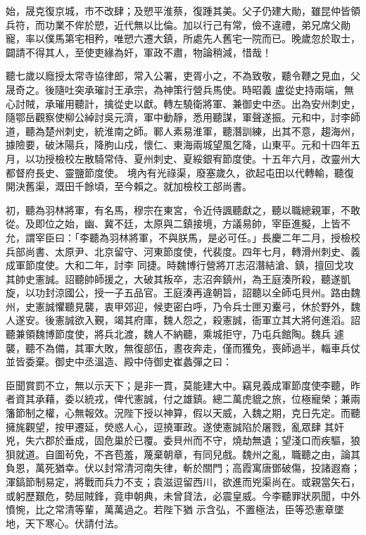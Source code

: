 \begin{pinyinscope}
 始，晟克復京城，市不改肆；及愬平淮蔡，復踵其美。父子仍建大勛，雖昆仲皆領兵符，而功業不侔於愬，近代無以比倫。加以行己有常，儉不違禮，弟兄席父勛寵，率以僕馬第宅相矜，唯愬六遷大鎮，所處先人舊宅一院而已。晚歲忽於取士，闢請不得其人，至使吏緣為奸，軍政不肅，物論稍減，惜哉！



 聽七歲以廕授太常寺協律郎，常入公署，吏胥小之，不為致敬，聽令鞭之見血，父晟奇之。後隨吐突承璀討王承宗，為神策行營兵馬使。時昭義
 盧從史持兩端，無心討賊，承璀用聽計，擒從史以獻。轉左驍衛將軍、兼御史中丞。出為安州刺史，隨鄂岳觀察使柳公綽討吳元濟，軍中動靜，悉用聽謀，軍聲遂振。元和中，討李師道，聽為楚州刺史，統淮南之師。鄆人素易淮軍，聽潛訓練，出其不意，趨海州，據險要，破沐陽兵，降朐山戍，懷仁、東海兩城望風乞降，山東平。元和十四年五月，以功授檢校左散騎常侍、夏州刺史、夏綏銀宥節度使。十五年六月，改靈州大都督府長史、靈鹽節度使。
 境內有光祿渠，廢塞歲久，欲起屯田以代轉輸，聽復開決舊渠，溉田千餘頃，至今賴之。就加檢校工部尚書。



 初，聽為羽林將軍，有名馬，穆宗在東宮，令近侍諷聽獻之，聽以職總親軍，不敢從。及即位之始，幽、冀不廷，太原與二鎮接境，方議易帥，宰臣進擬，上皆不允，謂宰臣曰：「李聽為羽林將軍，不與朕馬，是必可任。」長慶二年二月，授檢校兵部尚書、太原尹、北京留守、河東節度使，代裴度。四年七月，轉滑州刺史、義成軍節度使。大和二年，討李
 同捷。時魏博行營將丌志沼潛結滄、鎮，擅回戈攻其帥史憲誠。詔聽帥師援之，大破其叛卒，志沼奔鎮州，為王庭湊所殺，聽遂凱旋，以功封涼國公，授一子五品官。王庭湊再違朝旨，詔聽以全師屯貝州。路由魏州，史憲誠懼聽見襲，衷甲郊迎，候吏密白呼，乃令兵士匣刃櫜弓，休於野外，魏人遂安。後憲誠欲入覲，竭其府庫，魏人怨之，殺憲誠，衙軍立其大將何進滔。詔聽兼領魏博節度使，將兵北渡，魏人不納聽，乘城拒守，乃屯兵館陶。魏兵
 遽襲，聽不為備，其軍大敗，無復部伍，晝夜奔走，僅而獲免，喪師過半，輜車兵仗並皆委棄。御史中丞溫造、殿中侍御史崔蠡彈之曰：



 臣聞賞罰不立，無以示天下；是非一貫，莫能建大中。竊見義成軍節度使李聽，昨者資其承藉，委以統戎，俾代憲誠，付之雄鎮。總二萬虎貔之旅，位極寵榮；兼兩籓節制之權，心無報效。況陛下授以神算，假以天威，入魏之期，克日先定。而聽擁旄觀望，按甲遷延，熒惑人心，逗撓軍政。遂使憲誠陷於屠戮，亂眾肆
 其奸兇，失六郡於垂成，固危巢於已覆。委貝州而不守，燒劫無遺；望淺口而疾驅，狼狽就道。自圖茍免，不吝苞羞，蔑棄朝章，有同兒戲。魏州之亂，職聽之由，論其負恩，萬死猶幸。伏以封常清河南失律，斬於關門；高霞寓唐鄧破傷，投諸遐裔；渾鎬節制易定，將戰而兵力不支；袁滋逗留西川，欲進而兇渠尚在。或親當矢石，或躬歷艱危，勢屈賊鋒，竟申朝典，未曾貸法，必震皇威。今李聽罪狀夙聞，中外憤惋，比之常清等輩，萬萬過之。若陛下猶
 示含弘，不置極法，臣等恐憲章墜地，天下寒心。伏請付法。




\end{pinyinscope}
